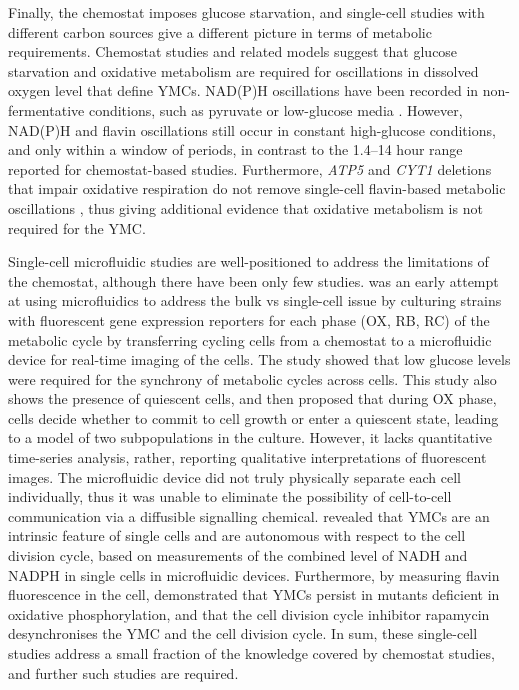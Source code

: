 Finally, the chemostat imposes glucose starvation, and single-cell studies with different carbon sources give a different picture in terms of metabolic requirements.
Chemostat studies and related models suggest that glucose starvation and oxidative metabolism are required for oscillations in dissolved oxygen level that define YMCs.
NAD(P)H oscillations have been recorded in non-fermentative conditions, such as pyruvate or low-glucose media \citep{papagiannakisAutonomousMetabolicOscillations2017}.
However, NAD(P)H \citep{papagiannakisAutonomousMetabolicOscillations2017,ozsezenInferenceHighLevelInteraction2019} and flavin \citep{baumgartnerFlavinbasedMetabolicCycles2018} oscillations still occur in constant high-glucose conditions, and only within a window of periods, in contrast to the 1.4--14 hour range reported for chemostat-based studies.
Furthermore, \emph{ATP5} and \emph{CYT1} deletions that impair oxidative respiration do not remove single-cell flavin-based metabolic oscillations \citep{baumgartnerFlavinbasedMetabolicCycles2018}, thus giving additional evidence that oxidative metabolism is not required for the YMC.

Single-cell microfluidic studies are well-positioned to address the limitations of the chemostat,
although there have been only few studies.
\citet{laxmanBehaviorMetabolicCycling2010} was an early attempt at using microfluidics to address the bulk vs single-cell issue by culturing strains with fluorescent gene expression reporters for each phase (OX, RB, RC) of the metabolic cycle by transferring cycling cells from a chemostat to a microfluidic device for real-time imaging of the cells.
The study showed that low glucose levels were required for the synchrony of metabolic cycles across cells.
This study also shows the presence of quiescent cells, and then proposed that during OX phase, cells decide whether to commit to cell growth or enter a quiescent state, leading to a model of two subpopulations in the culture.
However, it lacks quantitative time-series analysis, rather, reporting qualitative interpretations of fluorescent images.
The microfluidic device did not truly physically separate each cell individually, thus it was unable to eliminate the possibility of cell-to-cell communication via a diffusible signalling chemical.
\citet{papagiannakisAutonomousMetabolicOscillations2017} revealed that YMCs are an intrinsic feature of single cells and are autonomous with respect to the cell division cycle, based on measurements of the combined level of NADH and NADPH in single cells in microfluidic devices.
Furthermore, by measuring flavin fluorescence in the cell, \citet{baumgartnerFlavinbasedMetabolicCycles2018} demonstrated that YMCs persist in mutants deficient in oxidative phosphorylation, and that the cell division cycle inhibitor rapamycin desynchronises the YMC and the cell division cycle.
In sum, these single-cell studies address a small fraction of the knowledge covered by chemostat studies, and further such studies are required.


